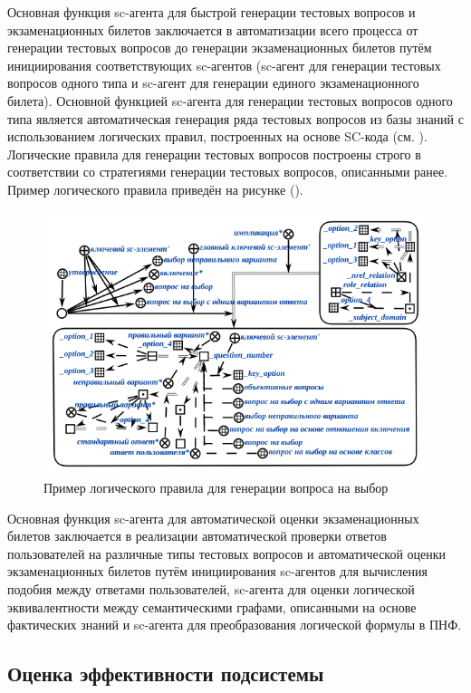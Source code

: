Основная функция sc-агента для быстрой генерации тестовых вопросов и экзаменационных билетов заключается в автоматизации всего процесса от генерации тестовых вопросов до генерации экзаменационных билетов путём инициирования соответствующих sc-агентов (sc-агент для генерации тестовых вопросов одного типа и sc-агент для генерации единого экзаменационного билета). Основной функцией sc-агента для генерации тестовых вопросов одного типа является автоматическая генерация ряда тестовых вопросов из базы знаний с использованием логических правил, построенных на основе SC-кода (см. ). Логические правила для генерации тестовых вопросов построены строго в соответствии со стратегиями генерации тестовых вопросов, описанными ранее. Пример логического правила приведён на рисунке (\textit{}).

\begin{figure}[H]
	\includegraphics[scale=1]{author/part7/figures/logic_rule_example.png}
	\caption{Пример логического правила для генерации вопроса на выбор}
	\label{fig:LRE_example}
\end{figure}

Основная функция sc-агента для автоматической оценки экзаменационных билетов заключается в реализации автоматической проверки ответов пользователей на различные типы тестовых вопросов и автоматической оценки экзаменационных билетов путём инициирования sc-агентов для вычисления подобия между ответами пользователей, sc-агента для оценки логической эквивалентности между семантическими графами, описанными на основе фактических знаний и sc-агента для преобразования логической формулы в ПНФ.

\subsection{Оценка эффективности подсистемы}

